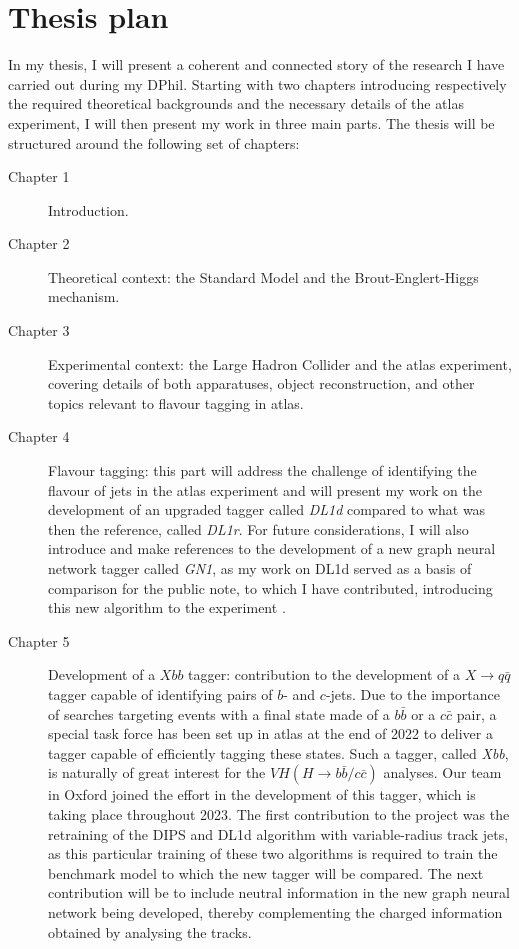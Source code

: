 \section*{Thesis plan}
In my thesis, I will present a coherent and connected story of the research I have carried out during my DPhil. Starting with two chapters introducing respectively the required theoretical backgrounds and the necessary details of the \gls{atlas} experiment, I will then present my work in three main parts.  The thesis will be structured around the following set of chapters:
\begin{description}
\item[Chapter 1] Introduction. \\ \vspace{-15pt}
\item[Chapter 2] Theoretical context: the Standard Model and the Brout-Englert-Higgs mechanism. \\  \vspace{-15pt}
\item[Chapter 3] Experimental context: the Large Hadron Collider and the \gls{atlas} experiment, covering details of both apparatuses, object reconstruction, and other topics relevant to flavour tagging in \gls{atlas}. \\  \vspace{-15pt}
\item[Chapter 4] Flavour tagging: this part will address the challenge of identifying the flavour of jets in the \gls{atlas} experiment and will present my work on the development of an upgraded tagger called \textit{DL1d} compared to what was then the reference, called \textit{DL1r}. For future considerations, I will also introduce and make references to the development of a new graph neural network tagger called \textit{GN1}, as my work on DL1d served as a basis of comparison for the public note, to which I have contributed, introducing this new algorithm to the experiment \cite{ATL-PHYS-PUB-2022-027}. \\  \vspace{-15pt}
\item[Chapter 5] Development of a $Xbb$ tagger: contribution to the development of a $X \rightarrow q\bar{q}$ tagger capable of identifying pairs of $b$- and $c$-jets.
Due to the importance of searches targeting events with a final state made of a $b\bar{b}$ or a $c\bar{c}$ pair, a special task force has been set up in \gls{atlas} at the end of 2022 to deliver a tagger capable of efficiently tagging these states. Such a tagger, called \textit{Xbb}, is naturally of great interest for the $VH (H \rightarrow b\bar{b} / c\bar{c})$ analyses. Our team in Oxford joined the effort in the development of this tagger, which is taking place throughout 2023. The first contribution to the project was the retraining of the DIPS and DL1d algorithm with variable-radius track jets, as this particular training of these two algorithms is required to train the benchmark model to which the new tagger will be compared. The next contribution will be to include neutral information in the new graph neural network being developed, thereby complementing the charged information obtained by analysing the tracks.  \\  \vspace{-15pt}

\end{description}
